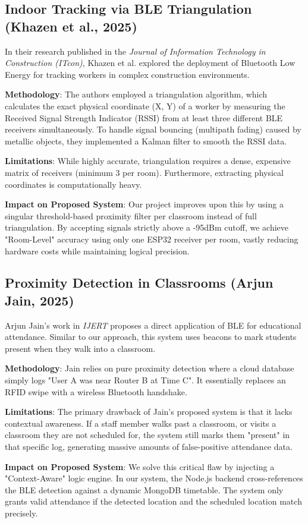 \subsection{Indoor Tracking via BLE Triangulation (Khazen et al., 2025)}
In their research published in the \textit{Journal of Information Technology in Construction (ITcon)}, Khazen et al. \cite{khazen2025} explored the deployment of Bluetooth Low Energy for tracking workers in complex construction environments. 
\par
\textbf{Methodology}: The authors employed a triangulation algorithm, which calculates the exact physical coordinate (X, Y) of a worker by measuring the Received Signal Strength Indicator (RSSI) from at least three different BLE receivers simultaneously. To handle signal bouncing (multipath fading) caused by metallic objects, they implemented a Kalman filter to smooth the RSSI data.
\par
\textbf{Limitations}: While highly accurate, triangulation requires a dense, expensive matrix of receivers (minimum 3 per room). Furthermore, extracting physical coordinates is computationally heavy.
\par
\textbf{Impact on Proposed System}: Our project improves upon this by using a singular threshold-based proximity filter per classroom instead of full triangulation. By accepting signals strictly above a -95dBm cutoff, we achieve "Room-Level" accuracy using only one ESP32 receiver per room, vastly reducing hardware costs while maintaining logical precision.

\subsection{Proximity Detection in Classrooms (Arjun Jain, 2025)}
Arjun Jain's work in \textit{IJERT} \cite{jain2025} proposes a direct application of BLE for educational attendance. Similar to our approach, this system uses beacons to mark students present when they walk into a classroom.
\par
\textbf{Methodology}: Jain relies on pure proximity detection where a cloud database simply logs "User A was near Router B at Time C". It essentially replaces an RFID swipe with a wireless Bluetooth handshake.
\par
\textbf{Limitations}: The primary drawback of Jain's proposed system is that it lacks contextual awareness. If a staff member walks past a classroom, or visits a classroom they are not scheduled for, the system still marks them "present" in that specific log, generating massive amounts of false-positive attendance data.
\par
\textbf{Impact on Proposed System}: We solve this critical flaw by injecting a "Context-Aware" logic engine. In our system, the Node.js backend cross-references the BLE detection against a dynamic MongoDB timetable. The system only grants valid attendance if the detected location and the scheduled location match precisely.

